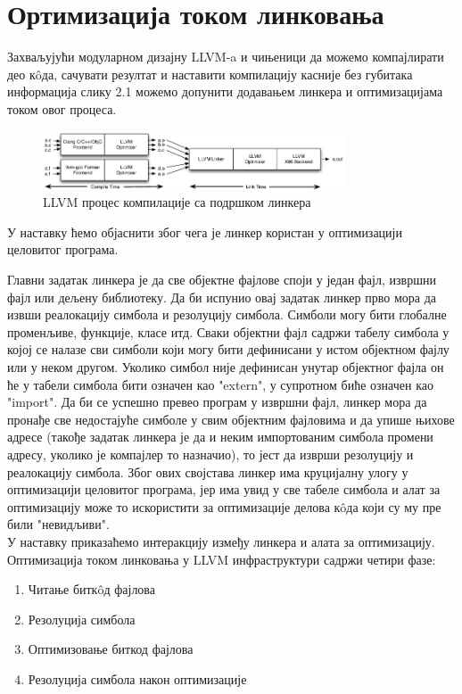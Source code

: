 \documentclass[12pt,oneside]{memoir}
\begin{document}
\section{Ортимизација током линковања}


Захваљујући модуларном дизајну LLVM-a и чињеници да можемо компајлирати део к\^{o}да,
сачувати резултат и наставити компилацију касније без губитака информација
слику 2.1 можемо допунити додавањем линкера и оптимизацијама током овог процеса.

\begin{figure}[!ht]
  \centering
  \includegraphics[width=0.8\textwidth]{LTO.png}
  \caption{LLVM процес компилације са подршком линкера}
  \label{fig:grafikon}
\end{figure}


У наставку ћемо објаснити због чега је линкер користан у оптимизацији целовитог програма.

Главни задатак линкера је да све објектне фајлове споји у један фајл, извршни фајл
или дељену библиотеку. 
Да би испунио овај задатак линкер прво мора да извши реалокацију симбола и резолуцију
симбола.
Симболи могу бити глобалне променљиве, функције, класе итд. 
Сваки објектни фајл садржи табелу симбола у којој се налазе сви симболи који 
могу бити дефинисани у истом објектном фајлу или у неком другом.
Уколико симбол није дефинисан унутар објектног фајла он ће у табели симбола бити
означен као "extern", у супротном биће означен као "import".
Да би се успешно превео програм у извршни фајл, линкер мора да пронађе све 
недостајуће симболе у свим објектним фајловима и да упише њихове адресе (такође задатак
линкера је да и неким импортованим симбола промени адресу, уколико је компајлер то назначио),
то јест да изврши резолуцију и реалокацију симбола.
Због ових својстава линкер има круцијалну улогу у оптимизацији целовитог програма, јер
има увид у све табеле симбола и алат за оптимизацију може то искористити за оптимизације
делова к\^{o}да који су му пре били "невидљиви". 
\\
У наставку приказаћемо интеракцију између линкера и алата за оптимизацију.
Оптимизација током линковања у LLVM инфраструктури садржи четири фазе:
\begin{enumerate}
\item Читање битк\^{o}д фајлова
\item Резолуција симбола
\item Оптимизовање биткод фајлова
\item Резолуција симбола након оптимизације
\end{enumerate}
\end{document}
